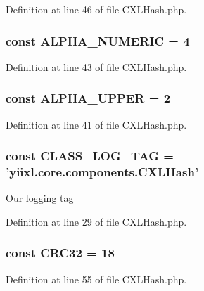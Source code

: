 Definition at line 46 of file CXLHash.php.

\hypertarget{classCXLHash_a1acce0cfa5c3723599af4c7e325b4312}{
\subsubsection[{ALPHA\_\-NUMERIC}]{\setlength{\rightskip}{0pt plus 5cm}const {\bf ALPHA\_\-NUMERIC} = 4}}
\label{classCXLHash_a1acce0cfa5c3723599af4c7e325b4312}


Definition at line 43 of file CXLHash.php.

\hypertarget{classCXLHash_a13afa6f8ce77da9bd4a5af5d473d0d8b}{
\subsubsection[{ALPHA\_\-UPPER}]{\setlength{\rightskip}{0pt plus 5cm}const {\bf ALPHA\_\-UPPER} = 2}}
\label{classCXLHash_a13afa6f8ce77da9bd4a5af5d473d0d8b}


Definition at line 41 of file CXLHash.php.

\hypertarget{classCXLHash_aa607ab5e557e6ebb60b85c5a20ad067f}{
\subsubsection[{CLASS\_\-LOG\_\-TAG}]{\setlength{\rightskip}{0pt plus 5cm}const {\bf CLASS\_\-LOG\_\-TAG} = 'yiixl.core.components.CXLHash'}}
\label{classCXLHash_aa607ab5e557e6ebb60b85c5a20ad067f}
Our logging tag 

Definition at line 29 of file CXLHash.php.

\hypertarget{classCXLHash_aeeccfbe476a8ab58ea0c3382287ff0e9}{
\subsubsection[{CRC32}]{\setlength{\rightskip}{0pt plus 5cm}const {\bf CRC32} = 18}}
\label{classCXLHash_aeeccfbe476a8ab58ea0c3382287ff0e9}


Definition at line 55 of file CXLHash.php.

